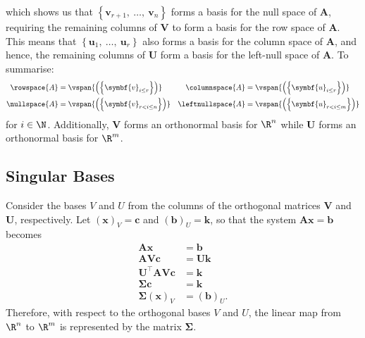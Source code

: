 \documentclass{article}
\begin{document}
which shows us that \(\left\{\symbf{v}_{r+1},\: \dots,\: \symbf{v}_{n}\right\}\) forms a basis for the null space of \(\symbf{A}\),
requiring the remaining columns of \(\symbf{V}\) to form a basis for the row space of \(\symbf{A}\).
This means that \(\left\{\symbf{u}_{1},\: \dots,\:
\symbf{u}_{r}\right\}\) also forms a basis for the column space of
\(\symbf{A}\), and hence, the remaining columns of \(\symbf{U}\) form a
basis for the left-null space of \(\symbf{A}\).
To summarise:
\begin{align*}
    \rowspace{A}  & = \vspan{\left( \left\{ \symbf{v}_{i \leq r} \right\} \right)}     & \columnspace{A}   & = \vspan{\left( \left\{ \symbf{u}_{i \leq r} \right\} \right)}     \\
    \nullspace{A} & = \vspan{\left( \left\{ \symbf{v}_{r < i \leq n} \right\} \right)} & \leftnullspace{A} & = \vspan{\left( \left\{ \symbf{u}_{r < i \leq m} \right\} \right)}
\end{align*}
for \(i \in \N\). Additionally, \(\symbf{V}\) forms an orthonormal basis for \(\R^n\) while
\(\symbf{U}\) forms an orthonormal basis for \(\R^m\).
\subsection{Singular Bases}
Consider the bases \(V\) and \(U\) from the columns of the orthogonal
matrices \(\symbf{V}\) and \(\symbf{U}\), respectively. Let \(\left(
\symbf{x} \right)_V = \symbf{c}\) and \(\left( \symbf{b} \right)_U =
\symbf{k}\), so that the system \(\symbf{A} \symbf{x} = \symbf{b}\)
becomes
\begin{align*}
    \symbf{A} \symbf{x}                          & = \symbf{b}                   \\
    \symbf{A} \symbf{V} \symbf{c}                & = \symbf{U} \symbf{k}         \\
    \symbf{U}^\top \symbf{A} \symbf{V} \symbf{c} & = \symbf{k}                   \\
    \symbf{\Sigma} \symbf{c}                     & = \symbf{k}                   \\
    \symbf{\Sigma} \left( \symbf{x} \right)_V    & = \left( \symbf{b} \right)_U.
\end{align*}
Therefore, with respect to the orthogonal bases \(V\) and \(U\), the linear map from \(\R^n\) to \(\R^m\) is represented
by the matrix \(\symbf{\Sigma}\).
\end{document}

